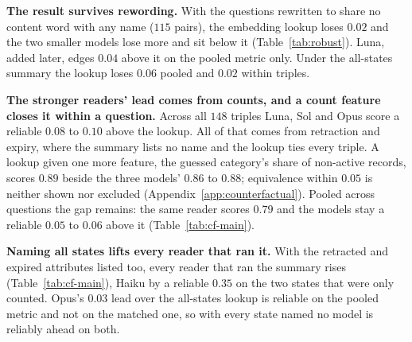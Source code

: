 \documentclass{article}
\newcommand{\claim}[1]{\textbf{#1}}
\begin{document}

\claim{The result survives rewording.}
With the questions rewritten to share no content word with any name ($115$ pairs), the embedding lookup loses $0.02$ and the two smaller models lose more and sit below it (Table~\ref{tab:robust}). Luna, added later, edges $0.04$ above it on the pooled metric only. Under the all-states summary the lookup loses $0.06$ pooled and $0.02$ within triples.

\claim{The stronger readers' lead comes from counts, and a count feature closes it within a question.}
Across all $148$ triples Luna, Sol and Opus score a reliable $0.08$ to $0.10$ above the lookup. All of that comes from retraction and expiry, where the summary lists no name and the lookup ties every triple. A lookup given one more feature, the guessed category's share of non-active records, scores $0.89$ beside the three models' $0.86$ to $0.88$; equivalence within $0.05$ is neither shown nor excluded (Appendix~\ref{app:counterfactual}). Pooled across questions the gap remains: the same reader scores $0.79$ and the models stay a reliable $0.05$ to $0.06$ above it (Table~\ref{tab:cf-main}).

\claim{Naming all states lifts every reader that ran it.}
With the retracted and expired attributes listed too, every reader that ran the summary rises (Table~\ref{tab:cf-main}), Haiku by a reliable $0.35$ on the two states that were only counted. Opus's $0.03$ lead over the all-states lookup is reliable on the pooled metric and not on the matched one, so with every state named no model is reliably ahead on both.
\end{document}
